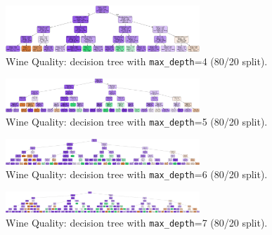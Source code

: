 \begin{figure}[H]
	\centering
	\includegraphics[width=0.65\textwidth]{imgs/dt-mini/dt__wine_quality__80_vs_20__4.png}
	\caption{Wine Quality: decision tree with \texttt{max\_depth}=4 (80/20 split).}\label{fig:wq-dt-depth-4}
\end{figure}

\begin{figure}[H]
	\centering
	\includegraphics[width=0.65\textwidth]{imgs/dt-mini/dt__wine_quality__80_vs_20__5.png}
	\caption{Wine Quality: decision tree with \texttt{max\_depth}=5 (80/20 split).}\label{fig:wq-dt-depth-5}
\end{figure}

\begin{figure}[H]
	\centering
	\includegraphics[width=0.65\textwidth]{imgs/dt-mini/dt__wine_quality__80_vs_20__6.png}
	\caption{Wine Quality: decision tree with \texttt{max\_depth}=6 (80/20 split).}\label{fig:wq-dt-depth-6}
\end{figure}

\begin{figure}[H]
	\centering
	\includegraphics[width=0.65\textwidth]{imgs/dt-mini/dt__wine_quality__80_vs_20__7.png}
	\caption{Wine Quality: decision tree with \texttt{max\_depth}=7 (80/20 split).}\label{fig:wq-dt-depth-7}
\end{figure}



